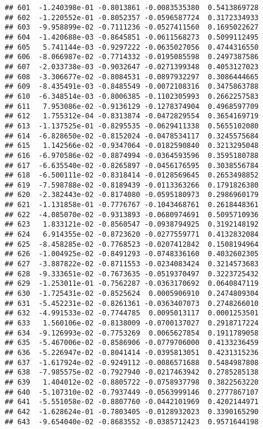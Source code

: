 \documentclass[
]{article}
\begin{document}
\begin{verbatim}
## 601  -1.240398e-01 -0.8013861 -0.0083535380  0.5413869728
## 602  -1.220552e-01 -0.8052357 -0.0596587724  0.3172334933
## 603  -9.958899e-02 -0.7111236 -0.0527411560  0.1695022627
## 604  -1.420688e-03 -0.8645851 -0.0611568273  0.5099112495
## 605   5.741144e-03 -0.9297222 -0.0635027056  0.4744316550
## 606  -8.066987e-02 -0.7714332 -0.0195085598  0.2497387586
## 607  -2.033738e-03 -0.9032647 -0.0271399348  0.4053127023
## 608  -3.306677e-02 -0.8084531 -0.0897932297  0.3086444665
## 609  -8.435491e-03 -0.8485549 -0.0072108316  0.3475863788
## 610  -6.348514e-03 -0.8006385 -0.1102305993  0.2662257583
## 611   7.953086e-02 -0.9136129 -0.1278374904  0.4968597709
## 612   1.755312e-04 -0.8313874 -0.0472829554  0.3654169719
## 613  -1.137525e-01 -0.8295535 -0.0629411338  0.5655102080
## 614  -6.828650e-02 -0.8152024 -0.0478534117  0.3245575684
## 615   1.142566e-02 -0.9347064 -0.0182590840  0.3213295048
## 616  -6.970586e-02 -0.8874994 -0.0364593596  0.3595180788
## 617  -6.635540e-02 -0.8265897 -0.0456176595  0.3038556784
## 618  -6.500111e-02 -0.8318414 -0.0128569645  0.2653498852
## 619  -7.598788e-02 -0.8189439 -0.0113363266  0.1791826380
## 620  -2.382443e-02 -0.8174080 -0.0595180973  0.2986960179
## 621  -1.131858e-01 -0.7776767 -0.1043468761  0.2618448361
## 622  -4.085070e-02 -0.9313893 -0.0680974691  0.5095710936
## 623   1.833121e-02 -0.8560547 -0.0938794925  0.3192148192
## 624   6.914355e-02 -0.8723620 -0.0277559771  0.4132832084
## 625  -8.458285e-02 -0.7768523 -0.0207412842  0.1508194964
## 626  -1.004925e-02 -0.8491293 -0.0748336160  0.4032602305
## 627  -3.887822e-02 -0.8711553 -0.0234083424  0.3214573683
## 628  -9.333651e-02 -0.7673635 -0.0519370497  0.3223725432
## 629  -1.253011e-01 -0.7562287 -0.0363170692  0.0640847119
## 630  -1.725431e-02 -0.8525624  0.0005906910  0.2474809304
## 631  -5.452231e-02 -0.8261361 -0.0363407073  0.2748266010
## 632  -4.991533e-02 -0.7744785  0.0095013117  0.0001253501
## 633   1.560106e-02 -0.8138009 -0.0700137027  0.2918717224
## 634  -9.126993e-02 -0.7753269  0.0065627854  0.1911789058
## 635  -5.467006e-02 -0.8586906 -0.0779706000  0.4133236459
## 636  -5.226947e-02 -0.8041414 -0.0395813051  0.4231315236
## 637  -1.617924e-02 -0.9249112 -0.0086571688  0.5484987808
## 638  -7.985575e-02 -0.7927940 -0.0217463942  0.2785285138
## 639   1.404012e-02 -0.8805722 -0.0758937798  0.3822563220
## 640  -5.107310e-02 -0.7937449 -0.0563999146  0.2777867107
## 641  -5.551058e-02 -0.8807760 -0.0442101969  0.4202144971
## 642  -1.628624e-01 -0.7803405 -0.0128932023  0.3390165290
## 643  -9.654040e-02 -0.8683552 -0.0385712423  0.9571644198

\end{verbatim}
\end{document}
